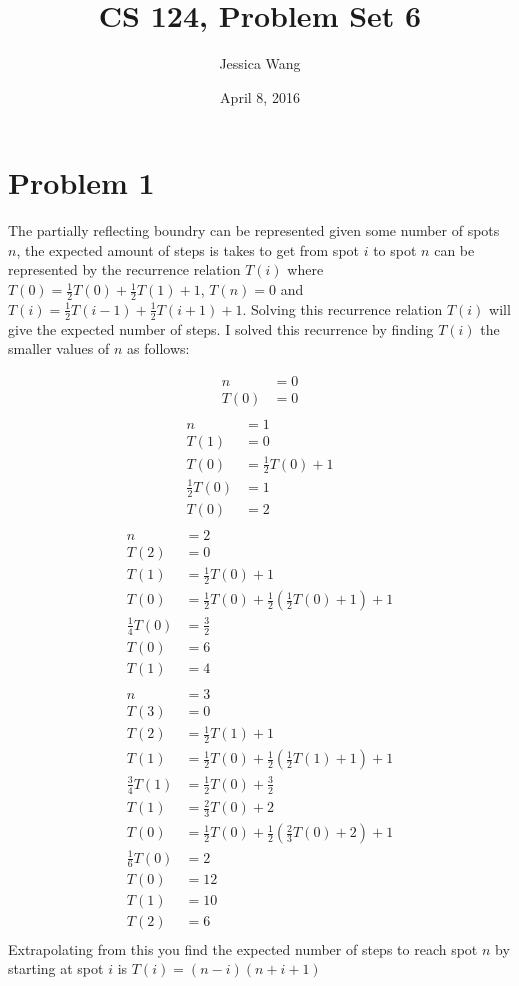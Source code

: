 \documentclass[11pt]{article}
\title{CS 124, Problem Set 6}
\author{Jessica Wang}
\date{April 8, 2016}
\begin{document}
\maketitle
\section*{Problem 1}
The partially reflecting boundry can be represented given some number of spots $n$, the expected amount of steps is takes to get from spot $i$ to spot $n$ can be represented by the recurrence relation $T(i)$ where $T(0)= \frac{1}{2}T(0) + \frac{1}{2}T(1) + 1$, $T(n)=0$ and $T(i) = \frac{1}{2}T(i-1) + \frac{1}{2}T(i+1) +1$. Solving this recurrence relation $T(i)$ will give the expected number of steps. I solved this recurrence by finding $T(i)$ the smaller values of $n$ as follows:

\begin{align*}
n &= 0\\
T(0) &= 0\\ 
\end{align*}
\begin{align*}
n &= 1\\
T(1) &= 0 \\
T(0) &= \frac{1}{2} T(0) + 1 \\
\frac{1}{2}T(0) &= 1\\
T(0) &= 2\\ 
\end{align*}
\begin{align*}
n &=2 \\
T(2) &= 0 \\
T(1) &= \frac{1}{2} T(0) +1 \\
T(0) &= \frac{1}{2}T(0) + \frac{1}{2}(\frac{1}{2} T(0) +1) + 1 \\
\frac{1}{4}T(0) &=  \frac{3}{2} \\
T(0) &= 6 \\
T(1) &= 4 \\
\end{align*}
\begin{align*}
n &= 3 \\
T(3) &=  0\\
T(2) &=  \frac{1}{2}T(1) + 1\\
T(1) &=  \frac{1}{2}T(0) +  \frac{1}{2}(\frac{1}{2}T(1) + 1) +1 \\
\frac{3}{4}T(1) &= \frac{1}{2}T(0) + \frac{3}{2} \\
T(1) &= \frac{2}{3} T(0) + 2\\
T(0) &= \frac{1}{2}T(0) + \frac{1}{2}(\frac{2}{3} T(0) + 2) + 1\\
\frac{1}{6} T(0) &= 2 \\
T(0) &= 12\\
T(1) &= 10\\
T(2) &= 6\\
\end{align*}
Extrapolating from this you find the expected number of steps to reach spot $n$ by starting at spot $i$ is $T(i) = (n-i)(n+i+1)$
\end{document}
